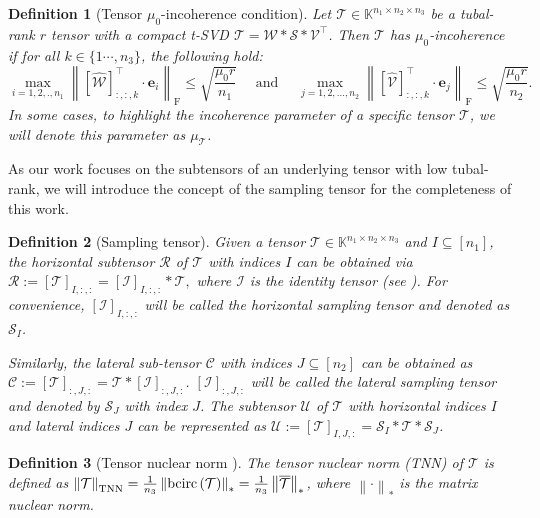\documentclass[twoside,12pt]{article}
\newtheorem{definition}{Definition}
\newcommand{\TNN}{\textnormal{TNN}}
\def\fro{{\mathrm{F}}}
\def\fro{{\mathrm{F}}}
\begin{document}
\begin{definition}[Tensor $\mu_0$-incoherence condition] \label{incoherence}
Let $\mathcal{T} \in \mathbb{K}^{n_1\times n_2\times n_3}$ 
 be a tubal-rank $r$ tensor with a compact t-SVD $\mathcal{T}=\mathcal{W}*\mathcal{S}*\mathcal{V}^{\top}$. Then  $\mathcal{T}$ has $\mu_0$-incoherence  if  for all $ k\in\{1\cdots,n_3\}$, the following  hold:
\begin{equation*}
\max _{i=1,2, ., n_1}\left\|[\widehat{\mathcal{W}}]_{:,:,k}^{\top} \cdot \mathbf{e}_i\right\|_{\fro} \leq \sqrt{\frac{\mu_0 r}{n_1 }} \quad 
 \text{ and } \quad 
\max _{j=1,2, \ldots, n_2}\left\|[\widehat{\mathcal{V}}]_{:,:,k}^{\top}\cdot \mathbf{e}_j\right\|_{\fro} \leq \sqrt{\frac{\mu_0 r}{n_2 }}.
\end{equation*}
In some cases, to highlight the incoherence parameter of a specific tensor $\mathcal{T}$, we will denote this parameter as $\mu_{\mathcal{T}}$.
\end{definition}
As our work focuses on the subtensors of an underlying tensor with low tubal-rank, we will introduce the concept of the sampling tensor for the completeness of this work. 
 \begin{definition}[Sampling tensor]\label{def:samp_tensor}\rm
Given a tensor $\mathcal{T}\in \mathbb{K}^{n_1\times n_2\times n_3}$ and $I\subseteq[n_1]$,  the horizontal subtensor $\mathcal{R}$ of $\mathcal{T}$ with indices $I$ can be obtained via 
\(
\mathcal{R}:=[\mathcal{T}]_{I,:,:}=[\mathcal{I}]_{I,:,:}\ast\mathcal{T},
\) 
where $\mathcal{I}$ is the identity tensor (see ).  
For convenience, $[\mathcal{I}]_{I,:,:}$ will be called the horizontal sampling tensor and denoted as $\mathcal{S}_{I}$.

Similarly, the lateral sub-tensor $\mathcal{C}$ with indices $J\subseteq[n_2]$ can be obtained as $\mathcal{C}:=[\mathcal{T}]_{:,J,:}=\mathcal{T}\ast[\mathcal{I}]_{:,J,:}$.  $[\mathcal{I}]_{:,J,:}$ will be called the lateral sampling tensor and denoted by $\mathcal{S}_{J}$ with   index   $J$. 
The subtensor $\mathcal{U}$ of $\mathcal{T}$ with horizontal indices $I$ and lateral indices $J$ can be represented as $\mathcal{U}:=[\mathcal{T}]_{I,J,:}=\mathcal{S}_I\ast\mathcal{T}\ast\mathcal{S}_{J}$. 
\end{definition}
\begin{definition}[Tensor nuclear norm \citep{%
Tarzanagh2018}]\rm
The tensor nuclear norm (\TNN) of $\mathcal{T}$ is defined as 
 $\left\|\mathcal{T}\right\|_{\TNN} 
 = \frac{1}{n_3}\left\|\operatorname{bcirc}{(\mathcal{T})}\right\|_{*}
 = \frac{1}{n_3}\left\|\overline{\mathcal{T}}\right\|_{*}$, 
 where $\left\|\cdot\right\|_{*}$ is the matrix nuclear norm.
 \end{definition}
\end{document}
